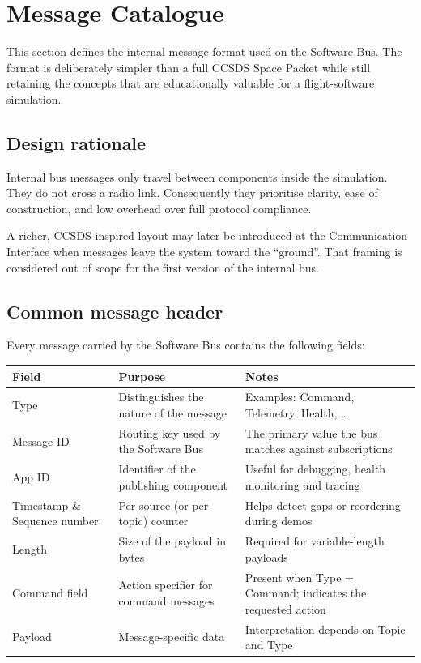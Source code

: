 \documentclass[11pt,a4paper]{article}
\begin{document}
\section{Message Catalogue}

This section defines the internal message format used on the Software Bus. The format is deliberately simpler than a full CCSDS Space Packet while still retaining the concepts that are educationally valuable for a flight-software simulation.

\subsection{Design rationale}

Internal bus messages only travel between components inside the simulation. They do not cross a radio link. Consequently they prioritise clarity, ease of construction, and low overhead over full protocol compliance.

A richer, CCSDS-inspired layout may later be introduced at the Communication Interface when messages leave the system toward the ``ground''. That framing is considered out of scope for the first version of the internal bus.

\subsection{Common message header}

Every message carried by the Software Bus contains the following fields:

\begin{center}
\begin{tabular}{@{}llp{8cm}@{}}
\toprule
\textbf{Field} & \textbf{Purpose} & \textbf{Notes} \\
\midrule
Type            & Distinguishes the nature of the message & Examples: Command, Telemetry, Health, \ldots \\
Message ID           & Routing key used by the Software Bus   & The primary value the bus matches against subscriptions \\
App ID      & Identifier of the publishing component & Useful for debugging, health monitoring and tracing \\
Timestamp \& Sequence number & Per-source (or per-topic) counter      & Helps detect gaps or reordering during demos \\
Length          & Size of the payload in bytes           & Required for variable-length payloads \\
Command field   & Action specifier for command messages  & Present when Type = Command; indicates the requested action \\
Payload         & Message-specific data                  & Interpretation depends on Topic and Type \\
\bottomrule
\end{tabular}
\end{center}
\end{document}
